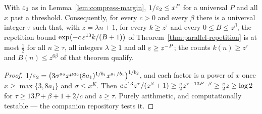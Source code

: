\begin{lemma}
\label{lem:compress-tau}
\leanok
With $\varepsilon_2$ as in Lemma~\ref{lem:compress-margin}, $1 / \varepsilon_2 \leq x^P$ for a universal
$P$ and all $x$ past a threshold. Consequently, for every $c > 0$ and every $\beta$ there is
a universal integer $\tau$ such that, with $z = \lambda n + 1$, for every $k \geq z^\tau$ and
every $0 \leq B \leq z^\beta$, the repetition bound $\exp\bigl( -c\, \varepsilon^{13} k / (B + 1)
\bigr)$ of Theorem~\ref{thm:parallel-repetition} is at most $\frac12$ for all $n \geq \tau$,
all integers $\lambda \geq 1$ and all $\varepsilon \geq z^{-P}$; the counts $k(n) \geq z^\tau$ and
$B(n) \leq z^{6\beta}$ of that theorem qualify.
\end{lemma}
\begin{proof}
\leanok
$1 / \varepsilon_2 = \bigl( 3 \sigma^{a_2} x^{\mu a_2} (8 a_1)^{1/b_1} x^{a_1/b_1} \bigr)^{1/b_2}$,
and each factor is a power of $x$ once $x \geq \max\{3, 8 a_1\}$ and $\sigma \leq x^K$. Then
$c\, \varepsilon^{13} z^\tau / (z^\beta + 1) \geq \frac{c}{2} z^{\tau - 13 P - \beta} \geq
\frac{c}{2} z \geq \log 2$ for $\tau \geq 13 P + \beta + 1 + 2/c$ and $z \geq \tau$. Purely
arithmetic, and computationally testable --- the companion repository tests it.
\end{proof}

\effortEasy

